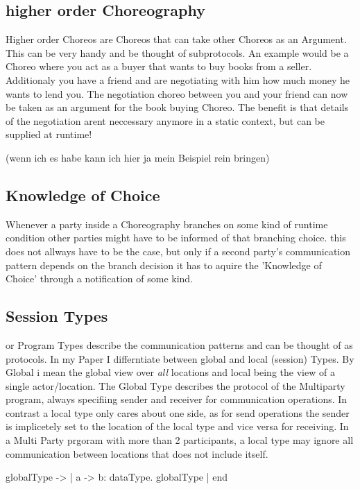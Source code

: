 \subsection{higher order Choreography}
Higher order Choreos are Choreos that can take other Choreos as an Argument. This can be very handy and be thought of subprotocols. An example would be a Choreo where you act as a buyer that wants to buy books from a seller. Additionaly you have a friend and are negotiating with him how much money he wants to lend you. The negotiation choreo between you and your friend can now be taken as an argument for the book buying Choreo. The benefit is that details of the negotiation arent neccessary anymore in a static context, but can be supplied at runtime!

(wenn ich es habe kann ich hier ja mein Beispiel rein bringen)


\subsection{Knowledge of Choice}

Whenever a party inside a Choreography branches on some kind of runtime condition other parties might have to be informed of that branching choice. this does not allways have to be the case, but only if a second party's communication pattern depends on the branch decision it has to aquire the 'Knowledge of Choice' through a notification of some kind.

\subsection{Session Types}
or Program Types describe the communication patterns and can be thought of as protocols. In my Paper I differntiate between global and local (session) Types. By Global i mean the global view over \emph{all} locations and local being the view of a single actor/location. The Global Type describes the protocol of the Multiparty program, always specifiing sender and receiver for communication operations. In contrast a local type only cares about one side, as for send operations the sender is implicetely set to the location of the local type and vice versa for receiving. In a Multi Party prgoram with more than 2 participants, a local type may ignore all communication between locations that does not include itself.

globalType ->
\newline | a -> b: dataType. globalType
\newline | end

